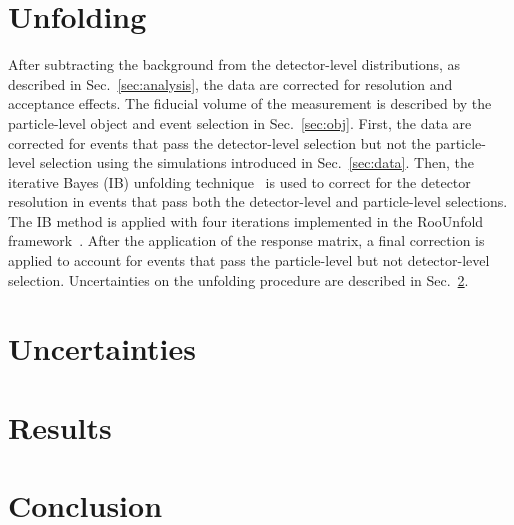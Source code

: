 \documentclass[PAPER, atlasdraft=true, texlive=2016, UKenglish,coverpage]{\ATLASLATEXPATH atlasdoc}
\begin{document}
\section{Unfolding}
\label{sec:unfold}

After subtracting the background from the detector-level distributions, as described in Sec.~\ref{sec:analysis}, the data are corrected for resolution and acceptance effects.  The fiducial volume of the measurement is described by the particle-level object and event selection in Sec.~\ref{sec:obj}.  First, the data are corrected for events that pass the detector-level selection but not the particle-level selection using the simulations introduced in Sec.~\ref{sec:data}.  Then, the iterative Bayes (IB) unfolding technique~\cite{DAgostini:1994zf} is used to correct for the detector resolution in events that pass both the detector-level and particle-level selections.  The IB method is applied with four iterations implemented in the RooUnfold framework~\cite{Adye:2011gm}.  After the application of the response matrix, a final correction is applied to account for events that pass the particle-level but not detector-level selection.  Uncertainties on the unfolding procedure are described in Sec.~\ref{sec:systs}.

\section{Uncertainties}
\label{sec:systs}



\section{Results}
\label{sec:result}


\FloatBarrier

\section{Conclusion}
\label{sec:conclusion}
\end{document}
